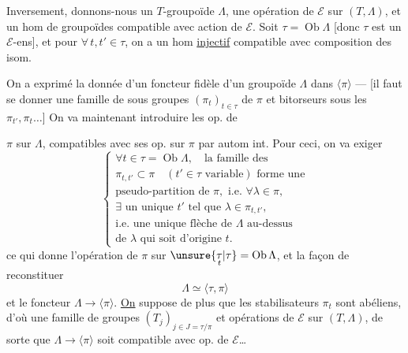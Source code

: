 Inversement, donnons-nous  un $T$-groupoïde  $\Lambda$, une opération de $\mathcal E$ sur $(T,\Lambda)$, et un hom de groupoïdes
compatible avec action de $\mathcal E$.
Soit $\tau=\operatorname{Ob}\Lambda$ [donc $\tau$ est un $\mathcal E$-ens], et pour $\forall\,t,t'\in\tau$, on a un hom \uline{injectif}
compatible avec composition des isom.

On a exprimé la donnée d'un foncteur fidèle d'un groupoïde $\Lambda$ dans $\langle\pi\rangle$ ---  [il faut se donner une famille de sous groupes $(\pi_t)_{t\in\tau}$ de $\pi$ et  bitorseurs sous les $\pi_{t'},\pi_t\ldots$] On va maintenant introduire les op. de

$\pi$ sur $\Lambda$, compatibles avec ses op. sur $\pi$ par autom int. Pour ceci, on va exiger
\[
\left\{\begin{gathered}
\forall t\in\tau=\operatorname{Ob}\Lambda,\quad\text{la famille des}\\
\pi_{t,t'}\subset\pi\quad(t'\in\tau\text{ variable})\text{ forme une}\\
\text{pseudo-partition de }\pi,\text{ i.e. }\forall\lambda\in\pi,\\
\exists\text{ un unique }t'\text{ tel que }\lambda\in\pi_{t,t'},\\
\text{i.e. une unique flèche de }\Lambda\text{ au-dessus}\\
\text{de }\lambda\text{ qui soit d'origine }t.
\end{gathered}\right.
\]
ce qui donne l'opération de $\pi$ sur $\unsure{\underset{t}{\tau}|\tau}=\operatorname{Ob}\Lambda$, et la façon de reconstituer
\[
\Lambda\simeq\langle\tau,\pi\rangle
\]
et le foncteur $\Lambda\longrightarrow\langle\pi\rangle$. \uline{On}  suppose de plus que les stabilisateurs $\pi_t$ sont abéliens, d'où une famille de groupes $(T_j)_{j\in J=\tau/\pi}$ et opérations de $\mathcal E$ sur $(T,\Lambda)$, de sorte que $\Lambda\longrightarrow\langle\pi\rangle$ soit compatible avec op. de $\mathcal E$\ldots

